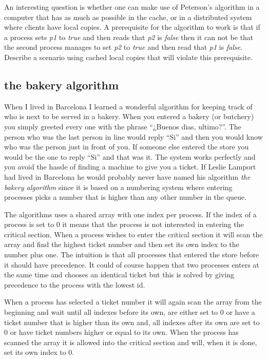 \documentclass[a4paper,11pt]{article}
\begin{document}
An interesting question is whether one can make use of Peterson's
algorithm in a computer that has as much as possible in the cache, or
in a distributed system where clients have local copies. A
prerequisite for the algorithm to work is that if a process sets {\em
  p1} to {\em true} and then reads that {\em p2} is {\em false} then
it can not be that the second process manages to set {\em p2} to {\em
  true} and then read that {\em p1} is {\em false}. Describe a
scenario using cached local copies that will violate this prerequisite.


\subsection{the bakery algorithm}

When I lived in Barcelona I learned a wonderful algorithm for keeping
track of who is next to be served in a bakery. When you entered a
bakery (or butchery) you simply greeted every one with the phrase
``¿Buenos dias, ultimo?''. The person who was the last person in line
would reply ``Si'' and then you would know who was the person just in
front of you. If someone else entered the store you would be the one
to reply ``Si'' and that was it. The system works perfectly and you
avoid the hassle of finding a machine to give you a ticket. If Leslie
Lamport had lived in Barcelona he would probably never have named his
algorithm {\em the bakery algorithm} since it is based on a numbering
system where entering processes picks a number that is higher than any
other number in the queue.

The algorithms uses a shared array with one index per process. If the
index of a process is set to $0$
it means that the process is not interested in entering the
critical section. When a process wishes to enter the critical section it
will scan the array and find the highest ticket number and then set
its own index to the number plus one. The intuition is that all
processes that entered the store before it should have precedence. It
could of course happen that two processes enters at the same time and
chooses an identical ticket but this is solved by giving precedence to
the process with the lowest id.

When a process has selected a ticket number it will again scan the
array from the beginning and wait until all indexes before its own, are
either set to $0$
or have a ticket number that is higher than its own and, all indexes
after its own are set to $0$
or have ticket numbers higher or equal to its own. When the process
has scanned the array it is allowed into the critical section and will,
when it is done, set its own index to $0$.
\end{document}
